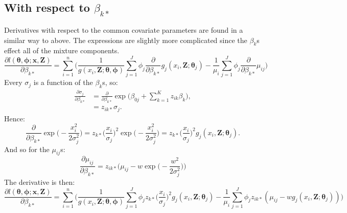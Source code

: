 \documentclass[useAMS,referee]{biom}
\begin{document}
\subsection*{With respect to $\beta_{k*}$}

Derivatives with respect to the common covariate parameters are found in a similar way to above. The expressions are slightly more complicated since the $\beta_k$s effect all of the mixture components.
\begin{equation*}
\frac{\partial l(\bm{\theta},\bm{\phi}; \mathbf{x},\mathbf{Z})}{\partial \beta_{k*}} = \sum_{i=1}^n \Big( \frac{1}{g(x_i,\mathbf{Z}; \bm{\theta},\bm{\phi})} \sum_{j=1}^J \phi_j \frac{\partial}{\partial \beta_{k*}} g_j(x_i,\mathbf{Z}; \bm{\theta}_j) - \frac{1}{\mu_i} \sum_{j=1}^J \phi_j \frac{\partial}{\partial \beta_{k*}}\mu_{ij}\Big)
\end{equation*}
Every $\sigma_{j}$ is a function of the $\beta_{k}$s, so:
\begin{align*}
\frac{\partial \sigma_{j}}{\partial \beta_{k*}} &= \frac{\partial}{\partial \beta_{k*}} \exp \Big( \beta_{0j} + \sum_{k=1}^K z_{ik} \beta_{k}\Big),\\
&= z_{ik*}\sigma_{j}.
\end{align*}
Hence:
\begin{equation*}
 \frac{\partial}{\partial \beta_{k*}} \exp\Big( -\frac{x_i^2}{2\sigma_{j}^2} \Big) = z_{k*} \Big( \frac{x_i}{\sigma_{j}}\Big)^2 \exp \Big(-\frac{x_i^2}{2 \sigma_{j}^2}\Big) = z_{k*} \Big( \frac{x_i}{\sigma_{j}}\Big)^2 g_j(x_i,\mathbf{Z}; \bm{\theta}_j).
 \label{detfct-deriv-k}
\end{equation*}
And so for the $\mu_{ij}$s:
\begin{equation*}
\frac{\partial \mu_{ij}}{\partial \beta_{k*}} = z_{ik*} \Big( \mu_{ij} - w \exp\Big( -\frac{w^2}{2\sigma_{j}^2} \Big) \Big)
\end{equation*}
The derivative is then:
\begin{equation*}
\frac{\partial l(\bm{\theta},\bm{\phi}; \mathbf{x},\mathbf{Z})}{\partial \beta_{k*}} = \sum_{i=1}^n \Big( \frac{1}{g(x_i,\mathbf{Z}; \bm{\theta},\bm{\phi})} \sum_{j=1}^J \phi_j  z_{k*} \Big( \frac{x_i}{\sigma_{j}}\Big)^2 g_j(x_i,\mathbf{Z}; \bm{\theta}_j) - \frac{1}{\mu_i} \sum_{j=1}^J \phi_j z_{ik*} ( \mu_{ij} - w g_j(x_i,\mathbf{Z}; \bm{\theta}_j) )\Big)
\end{equation*}
\end{document}
